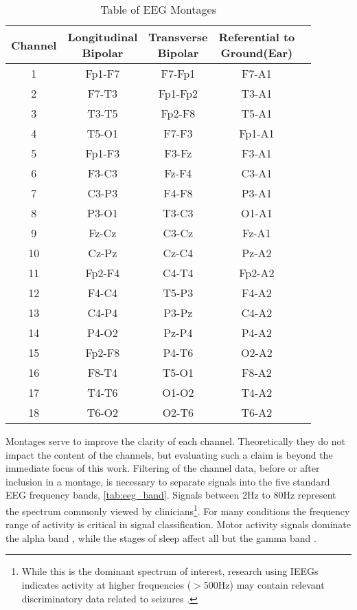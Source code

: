 \begin{table}[ht]
\caption{Table of EEG Montages}
\centering
\begin{tabular}{ c c c c c }
\toprule
Channel & \makecell{Longitudinal\\Bipolar} & \makecell{Transverse\\Bipolar} &
\makecell{Referential to\\Ground(Ear)} \\
\midrule
1 & Fp1-F7	& F7-Fp1		& F7-A1		\\
2 & F7-T3		& Fp1-Fp2		& T3-A1		\\
3 & T3-T5		& Fp2-F8		& T5-A1		\\
4 & T5-O1		& F7-F3		& Fp1-A1		\\
5 & Fp1-F3	& F3-Fz		& F3-A1		\\
6 & F3-C3		& Fz-F4		& C3-A1		\\
7 & C3-P3		& F4-F8		& P3-A1		\\
8 & P3-O1		& T3-C3		& O1-A1		\\
9 & Fz-Cz		& C3-Cz		& Fz-A1		\\
10 & Cz-Pz	& Cz-C4		& Pz-A2		\\
11 & Fp2-F4	& C4-T4		& Fp2-A2		\\
12 & F4-C4	& T5-P3		& F4-A2		\\
13 & C4-P4	& P3-Pz		& C4-A2		\\
14 & P4-O2	& Pz-P4		& P4-A2		\\
15 & Fp2-F8	& P4-T6		& O2-A2		\\
16 & F8-T4	& T5-O1		& F8-A2		\\
17 & T4-T6	& O1-O2		& T4-A2		\\
18 & T6-O2	& O2-T6		& T6-A2		\\
\bottomrule
\end{tabular}
\label{tab:eeg_montage}
\end{table}

Montages serve to improve the clarity of each channel. Theoretically they do not impact the content of the channels, but evaluating such a claim is beyond the immediate focus of this work. Filtering of the channel data, before or after inclusion in a montage, is necessary to separate signals into the five standard \ac{EEG} frequency bands, \cref{tab:eeg_band}. Signals between 2Hz to 80Hz represent the spectrum commonly viewed by clinicians\footnote{While this is the dominant spectrum of interest, research using \acp{IEEG} indicates activity at higher frequencies ($>$500Hz) may contain relevant discriminatory data related to seizures \cite{Blanco2010}.}. For many conditions  the frequency range of activity is critical in signal classification. Motor activity signals dominate the alpha band \cite{Dahne2014}, while the stages of sleep affect all but the gamma band \cite{Schluter2012}. 

